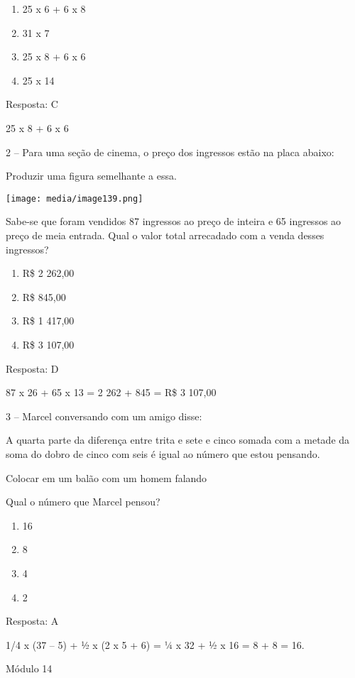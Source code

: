 \begin{enumerate}
\def\labelenumi{\alph{enumi})}
\item
  25 x 6 + 6 x 8
\item
  31 x 7
\item
  25 x 8 + 6 x 6
\item
  25 x 14
\end{enumerate}

Resposta: C

25 x 8 + 6 x 6

2 -- Para uma seção de cinema, o preço dos ingressos estão na placa
abaixo:

Produzir uma figura semelhante a essa.

\texttt{[image: media/image139.png]}

Sabe-se que foram vendidos 87 ingressos ao preço de inteira e 65
ingressos ao preço de meia entrada. Qual o valor total arrecadado com a
venda desses ingressos?

\begin{enumerate}
\def\labelenumi{\alph{enumi})}
\item
  R\$ 2 262,00
\item
  R\$ 845,00
\item
  R\$ 1 417,00
\item
  R\$ 3 107,00
\end{enumerate}

Resposta: D

87 x 26 + 65 x 13 = 2 262 + 845 = R\$ 3 107,00

3 -- Marcel conversando com um amigo disse:

A quarta parte da diferença entre trita e sete e cinco somada com a
metade da soma do dobro de cinco com seis é igual ao número que estou
pensando.

Colocar em um balão com um homem falando

Qual o número que Marcel pensou?

\begin{enumerate}
\def\labelenumi{\alph{enumi})}
\item
  16
\item
  8
\item
  4
\item
  2
\end{enumerate}

Resposta: A

1/4 x (37 -- 5) + ½ x (2 x 5 + 6) = ¼ x 32 + ½ x 16 = 8 + 8 = 16.

Módulo 14

